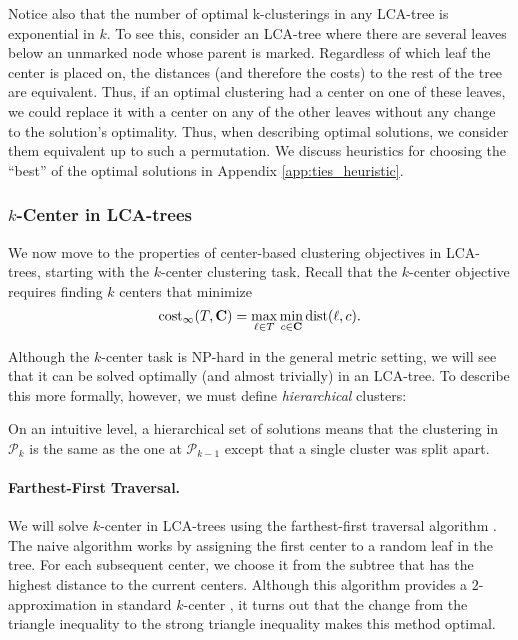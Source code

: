 Notice also that the number of optimal k-clusterings in any LCA-tree is exponential in $k$. To see this, consider an LCA-tree where there are several leaves
below an unmarked node whose parent is marked.  Regardless of which leaf the center is placed on, the distances (and therefore the costs) to the rest of the
tree are equivalent. Thus, if an optimal clustering had a center on one of these leaves, we could replace it with a center on any of the other leaves without
any change to the solution's optimality. Thus, when describing optimal solutions, we consider them equivalent up to such a permutation. We discuss heuristics for choosing the ``best'' of the optimal solutions in Appendix \ref{app:ties_heuristic}.

\subsubsection{$k$-Center in LCA-trees}

We now move to the properties of center-based clustering objectives in LCA-trees, starting with the $k$-center clustering task.
Recall that the $k$-center objective requires finding $k$ centers that minimize 
\[ \text{cost}_\infty(T, \mathbf{C}) = \max_{\ell \in T} \min_{c \in \mathbf{C}} \text{dist}(\ell, c). \]

Although the $k$-center task is NP-hard in the general metric setting, we will see that it can be solved optimally (and almost trivially) in an LCA-tree. To describe
this more formally, however, we must define \emph{hierarchical} clusters:

\Hierarchy*

On an intuitive level, a hierarchical set of solutions means that the clustering in $\mathcal{P}_k$ is the same as the one at $\mathcal{P}_{k-1}$ except that
a single cluster was split apart.

\paragraph{Farthest-First Traversal.} We will solve $k$-center in LCA-trees using the farthest-first traversal algorithm \cite{farthest_first, Har-Peled}. The naive algorithm
works by assigning the first center to a random leaf in the tree. For each subsequent center, we choose it from the subtree that has the highest distance
to the current centers.  Although this algorithm provides a $2$-approximation in standard $k$-center \cite{Har-Peled}, it turns out that the change from the
triangle inequality to the strong triangle inequality makes this method optimal.

